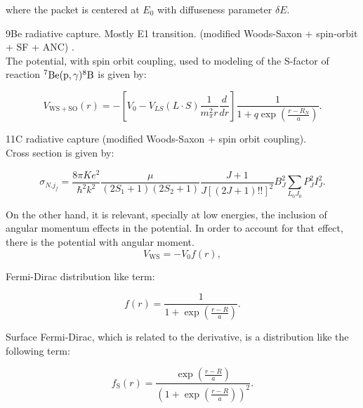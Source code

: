 \documentclass[openany]{book}
\begin{document}
where the packet is centered at $E_0$ with diffuseness parameter $\delta E$.

9Be radiative capture. Mostly E1 transition.  (modified Woods-Saxon + spin-orbit + SF + ANC) \cite{kabir_nabi_2021}. \\

The potential, with spin orbit coupling, used to modeling of the S-factor of reaction $\mathrm{{}^{7}Be(p, \gamma){}^{8}B}$ is given by:

\begin{equation}\label{eq:potential_woodsSaxon_spinOrbit}
	V_{\mathrm{WS+SO}}(r) = -[V_0 - V_{LS} (L \cdot S) \frac{1}{m^2_\pi r} \frac{d}{dr}]  \frac{1}{1 + q \exp {\left(\frac{r - R_N}{a}\right)}}.
\end{equation}

11C radiative capture (modified Woods-Saxon + spin orbit coupling)\cite{kabir_irgaziev_nabi_sagheer_2022}. \\

Cross section is given by:

\begin{equation}\label{eq:potential_radiativeCapture_crossSection_BJ}
	\sigma_{N. j_f} = \frac{8\pi K e^2}{\hbar^2 k^2} \frac{\mu}{(2S_1 + 1)(2S_2 + 1)} \frac{J + 1}{ J[(2J + 1)!!]^2} B^2_J \sum_{L_0J_0} {P^2_J I^2_J}.
\end{equation}

On the other hand, it is relevant, specially at low energies, the inclusion of angular momentum effects in the potential. In order to account for that effect, there is the potential with angular moment. \\

\begin{equation} \label{eq:potential_WoodsSaxon2}
	V_{\mathrm{WS}} = -V_0 f(r),
\end{equation}

Fermi-Dirac distribution like term: 

\begin{equation}  \label{eq:potential_WoodsSaxon2_fermiDirac}
	f(r) = \frac{1}{1 + \exp {\left(\frac{r- R}{a}\right)}}.
\end{equation}

Surface Fermi-Dirac, which is related to the derivative, is a distribution like the following term: 

\begin{equation}  \label{eq:potential_WoodsSaxon2_surfaceFermiDirac}
	f_{\mathrm{S}}(r) = \frac{\exp{\left(\frac{r - R}{a}\right)}}{\left(1 + \exp {\left(\frac{r- R}{a}\right)}\right)^2}.
\end{equation}
\end{document}
